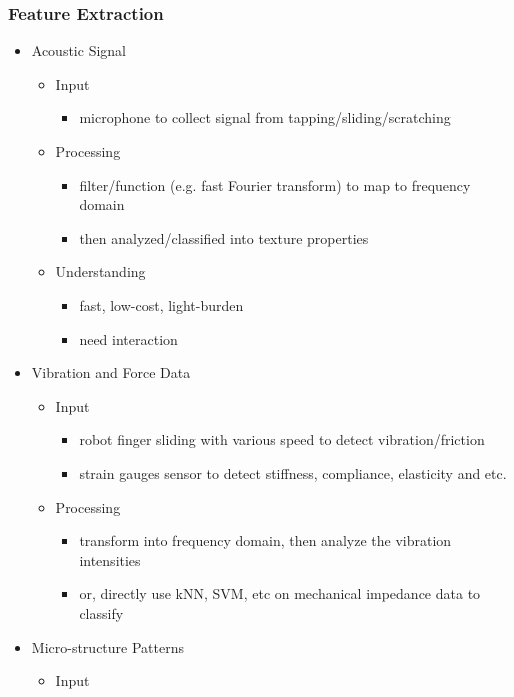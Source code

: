 \subsubsection{Feature Extraction}
\begin{itemize}
\item Acoustic Signal
	\begin{itemize}
	\item Input
		\begin{itemize}
		\item microphone to collect signal from tapping/sliding/scratching
		\end{itemize}
	\item Processing
		\begin{itemize}
		\item filter/function (e.g. fast Fourier transform) to map to frequency domain
		\item then analyzed/classified into texture properties
		\end{itemize}
	\item Understanding
		\begin{itemize}
		\item fast, low-cost, light-burden
		\item need interaction
		\end{itemize}
	\end{itemize}
\item Vibration and Force Data
	\begin{itemize}
	\item Input
		\begin{itemize}
		\item robot finger sliding with various speed to detect vibration/friction
		\item strain gauges sensor to detect stiffness, compliance, elasticity and etc.
		\end{itemize}
	\item Processing
		\begin{itemize}
		\item transform into frequency domain, then analyze the vibration intensities
		\item or, directly use kNN, SVM, etc on mechanical impedance data to classify
		\end{itemize}
	\end{itemize}
\item Micro-structure Patterns
	\begin{itemize}
	\item Input
		\begin{itemize}

\end{itemize}
\end{itemize}
\end{itemize}
